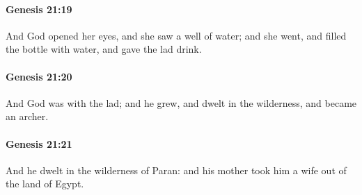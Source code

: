 		\paragraph{Genesis 21:19} %
			\label{GENESIS-21-19}

			And God opened her eyes, and she saw a well of water; and she went, and filled the bottle with water, and gave the lad drink.


		\paragraph{Genesis 21:20} %
			\label{GENESIS-21-20}

			And God was with the lad; and he grew, and dwelt in the wilderness, and became an archer.


		\paragraph{Genesis 21:21} %
			\label{GENESIS-21-21}

			And he dwelt in the wilderness of Paran: and his mother took him a wife out of the land of Egypt.


